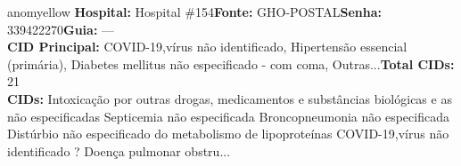 \documentclass[a4paper,10pt]{article}
\begin{document}
\begin{anomalycard}[Interna\c{c}\~{a}o \#11032 | Pac. \#11663 | MODERADO (z=2.34) | LOS: 16d | 23/02/2026\,$\to$\,11/03/2026]{anomyellow}
\textbf{Hospital:} Hospital \#154\quad \textbf{Fonte:} GHO-POSTAL\quad \textbf{Senha:} 339422270\quad \textbf{Guia:} ---\\

\textbf{CID Principal:} {\small COVID-19,vírus não identificado, Hipertensão essencial (primária), Diabetes mellitus não especificado - com coma, Outras...}\quad\textbf{Total CIDs:} 21\\

\textbf{CIDs:} {\scriptsize Intoxicação por outras drogas, medicamentos e substâncias biológicas e as não especificadas \textbar{} Septicemia não especificada \textbar{} Broncopneumonia não especificada \textbar{} Distúrbio não especificado do metabolismo de lipoproteínas \textbar{} COVID-19,vírus não identificado \textbar{} ? \textbar{} Doença pulmonar obstru...}\\

\end{anomalycard}
\end{document}
